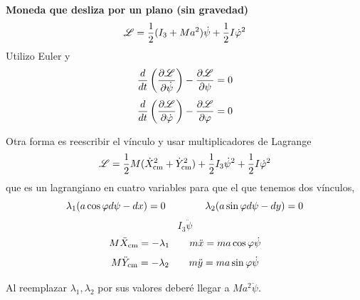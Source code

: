 \documentclass[10pt,oneside]{CBFT_book}
\begin{document}
\begin{ejemplo}{\bf Moneda que desliza por un plano (sin gravedad)}
\[
	\mathscr{L} = \frac 1 2 ( I_3 + Ma^2 ) \dot{\psi} + \frac 1 2 I \dot{\varphi}^2
\]
Utilizo Euler y
\[
	\frac{d^{\hspace{-0.05em}} {}}{d {t}^{\hspace{-0.05em}}}\left( \frac{\partial^{\hspace{-0.05em}} {\mathscr{L}}}{\partial {\dot{\psi}}^{\hspace{-0.05em}}} \right) - \frac{\partial^{\hspace{-0.05em}} {\mathscr{L}}}{\partial {\psi}^{\hspace{-0.05em}}} = 0
\]
\[
	\frac{d^{\hspace{-0.05em}} {}}{d {t}^{\hspace{-0.05em}}}\left( \frac{\partial^{\hspace{-0.05em}} {\mathscr{L}}}{\partial {\dot{\varphi}}^{\hspace{-0.05em}}} \right) - \frac{\partial^{\hspace{-0.05em}} {\mathscr{L}}}{\partial {\varphi}^{\hspace{-0.05em}}} = 0
\]

Otra forma es reescribir el vínculo y usar multiplicadores de Lagrange
\[
	\mathscr{L} = \frac 1 2 M ( \dot{X}^2_\text{cm} + \dot{Y}^2_\text{cm} ) + \frac 1 2 I_3 \dot{\psi}^2 + \frac 1 2 I \dot{\varphi}^2
\]
que es un lagrangiano en cuatro variables para que el que tenemos dos vínculos,
\[
	\lambda_1( a\cos\varphi d\psi - dx) = 0 \qquad \qquad  
	\lambda_2( a\sin\varphi d\psi - dy) = 0
\]
\[
	I_3 \ddot{\psi}  
\]
\[
	M \ddot{X}_\text{cm} = - \lambda_1 \qquad m \ddot{x} = m a \cos \varphi \dot{\psi}
\]
\[
	M \ddot{Y}_\text{cm} = - \lambda_2 \qquad m \ddot{y} = m a \sin \varphi \dot{\psi}
\]

Al reemplazar $\lambda_1, \lambda_2$ por sus valores deberé llegar a $M a^2 \ddot{\psi}$.

\end{ejemplo}





\end{document}
